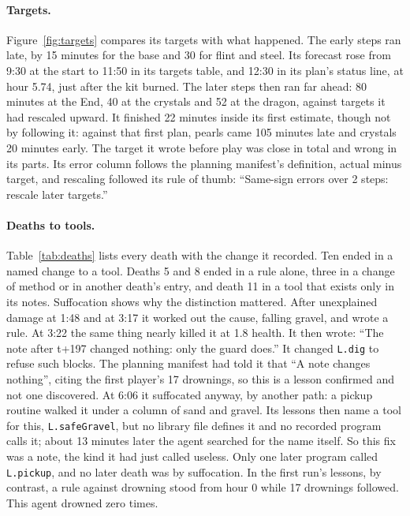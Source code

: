\documentclass[11pt,a4paper]{article}
\begin{document}
\paragraph{Targets.} Figure~\ref{fig:targets} compares its targets with what happened. The early steps ran late, by 15 minutes for the base and 30 for flint and steel. Its forecast rose from 9:30 at the start to 11:50 in its targets table, and 12:30 in its plan's status line, at hour 5.74, just after the kit burned. The later steps then ran far ahead: 80 minutes at the End, 40 at the crystals and 52 at the dragon, against targets it had rescaled upward. It finished 22 minutes inside its first estimate, though not by following it: against that first plan, pearls came 105 minutes late and crystals 20 minutes early. The target it wrote before play was close in total and wrong in its parts. Its error column follows the planning manifest's definition, actual minus target, and rescaling followed its rule of thumb: ``Same-sign errors over 2 steps: rescale later targets.''

\paragraph{Deaths to tools.} Table~\ref{tab:deaths} lists every death with the change it recorded. Ten ended in a named change to a tool. Deaths 5 and 8 ended in a rule alone, three in a change of method or in another death's entry, and death 11 in a tool that exists only in its notes. Suffocation shows why the distinction mattered. After unexplained damage at 1:48 and at 3:17 it worked out the cause, falling gravel, and wrote a rule. At 3:22 the same thing nearly killed it at 1.8 health. It then wrote: ``The note after t+197 changed nothing: only the guard does.'' It changed \texttt{L.dig} to refuse such blocks. The planning manifest had told it that ``A note changes nothing'', citing the first player's 17 drownings, so this is a lesson confirmed and not one discovered. At 6:06 it suffocated anyway, by another path: a pickup routine walked it under a column of sand and gravel. Its lessons then name a tool for this, \texttt{L.safeGravel}, but no library file defines it and no recorded program calls it; about 13 minutes later the agent searched for the name itself. So this fix was a note, the kind it had just called useless. Only one later program called \texttt{L.pickup}, and no later death was by suffocation. In the first run's lessons, by contrast, a rule against drowning stood from hour 0 while 17 drownings followed. This agent drowned zero times.
\end{document}
